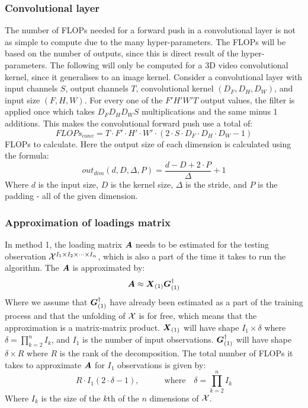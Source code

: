 \subsubsection{Convolutional layer}
The number of FLOPs needed for a forward push in a convolutional layer is not as simple to compute due to the many hyper-parameters. The FLOPs will be based on the number of outputs, since this is direct result of the hyper-parameters. The following will only be computed for a 3D video convolutional kernel, since it generalises to an image kernel. Consider a convolutional layer with input channels $S$, output channels $T$, convolutional kernel $(D_F, D_H, D_W)$, and input size $(F, H, W)$. For every one of the $F' H' W' T$ output values, the filter is applied once which takes $D_F D_H D_W S$ multiplications and the same minus 1 additions. This makes the convolutional forward push use a total of:
\begin{equation}
    FLOPs_{conv} = T\cdot F'\cdot H'\cdot W'\cdot (2\cdot S \cdot D_F\cdot D_H\cdot D_W - 1)
\end{equation}
FLOPs to calculate. Here the output size of each dimension is calculated using the formula:
\begin{equation}
    out_{dim}(d, D, \Delta, P) = \frac{d - D + 2\cdot P}{\Delta} + 1
\end{equation}
Where $d$ is the input size, $D$ is the kernel size, $\Delta$ is the stride, and $P$ is the padding - all of the given dimension.

\subsubsection{Approximation of loadings matrix}
In method 1, the loading matrix $\boldsymbol{A}$ needs to be estimated for the testing observation $\mathcal{X}^{I_1 \times I_2 \times \dots \times I_n}$, which is also a part of the time it takes to run the algorithm. The $\boldsymbol{A}$ is approximated by:
\begin{equation}
    \boldsymbol{A} \approx \boldsymbol{X}_{(1)} \boldsymbol{G}_{(1)}^{\dagger}
    \label{eq:estimation_of_loading_A}
\end{equation}
Where we assume that $\boldsymbol{G}_{(1)}^{\dagger}$ have already been estimated as a part of the training process and that the unfolding of $\mathcal{X}$ is for free, which means that the approximation is a matrix-matrix product. $\boldsymbol{X}_{(1)}$ will have shape $I_1 \times \delta$ where $\delta = \prod_{k=2}^n I_k$, and $I_1$ is the number of input observations. $\boldsymbol{G}_{(1)}^{\dagger}$ will have shape $\delta \times R$ where $R$ is the rank of the decomposition. The total number of FLOPs it takes to approximate $\boldsymbol{A}$ for $I_1$ observations is given by:
\begin{equation}
    R \cdot I_1 (2\cdot \delta - 1), \qquad \quad \text{where} \quad \delta = \prod_{k=2}^n I_k
\end{equation}
Where $I_k$ is the size of the $k$th of the $n$ dimensions of $\mathcal{X}$.